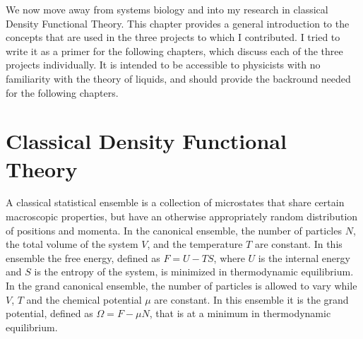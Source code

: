 \label{chapter:intro}
We now move away from systems biology and into my research in
classical Density Functional Theory.  This chapter provides a general
introduction to the concepts that are used in the three projects to
which I contributed.  I tried to write it as a primer for the
following chapters, which discuss each of the three projects
individually.  It is intended to be accessible to physicists with no
familiarity with the theory of liquids, and should provide the
backround needed for the following chapters.


\section{Classical Density Functional Theory}




A classical statistical ensemble is a collection of microstates that
share certain macroscopic properties, but have an otherwise
appropriately random distribution of positions and momenta.  In the
canonical ensemble, the number of particles $N$, the total volume of
the system $V$, and the temperature $T$ are constant.  In this
ensemble the free energy, defined as $F = U - TS$, where $U$ is the
internal energy and $S$ is the entropy of the system, is minimized in
thermodynamic equilibrium. In the grand canonical ensemble, the number
of particles is allowed to vary while $V$, $T$ and the chemical
potential $\mu$ are constant.  In this ensemble it is the grand
potential, defined as $\Omega = F - \mu N$, that is at a minimum in
thermodynamic equilibrium.

